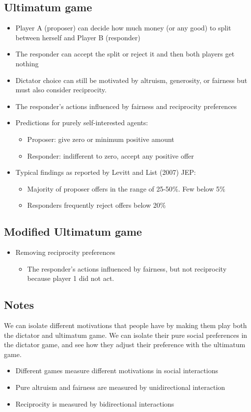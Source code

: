 \subsection{Ultimatum game}
\begin{itemize}
    \item Player A (proposer) can decide how much money (or any good) to split between herself and Player B (responder)
    \item The responder can accept the split or reject it and then both players get nothing
    \item Dictator choice can still be motivated by altruism, generosity, or fairness but must also consider reciprocity.
    \item The responder's actions influenced by fairness and reciprocity preferences
    \item Predictions for purely self-interested agents:
    \begin{itemize}
        \item Proposer: give zero or minimum positive amount
        \item Responder: indifferent to zero, accept any positive offer
    \end{itemize}
    \item Typical findings as reported by Levitt and List (2007) JEP:
    \begin{itemize}
        \item Majority of proposer offers in the range of 25-50$\%$. Few below 5$\%$
        \item Responders frequently reject offers below 20$\%$
        \end{itemize}
\end{itemize}
\subsection{Modified Ultimatum game}
\begin{itemize}
    \item Removing reciprocity preferences
    \begin{itemize}
        \item The responder's actions influenced by fairness, but not reciprocity because player 1 did not act.
        
    \end{itemize}
\end{itemize}
\subsection{Notes}
We can isolate different motivations that people have by making them play both the dictator and ultimatum game. We can isolate their pure social preferences in the dictator game, and see how they adjust their preference with the ultimatum game.
\begin{itemize}
    \item Different games measure different motivations in social interactions
    \item Pure altruism and fairness are measured by unidirectional interaction
    \item Reciprocity is measured by bidirectional interactions
\end{itemize}
